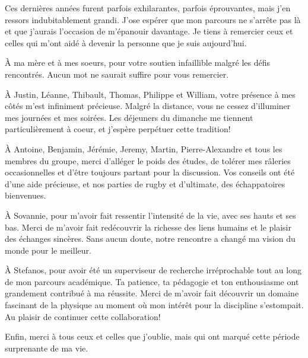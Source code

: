 \begin{comment}
\end{comment}

Ces dernières années furent parfois exhilarantes, parfois éprouvantes, mais j'en ressors indubitablement grandi. J'ose espérer que mon parcours ne s'arrête pas là et que j'aurais l'occasion de m'épanouir davantage. Je tiens à remercier ceux et celles qui m'ont aidé à devenir la personne que je suis aujourd'hui.

À ma mère et à mes soeurs, pour votre soutien infaillible malgré les défis rencontrés. Aucun mot ne saurait suffire pour vous remercier.

À Justin, Léanne, Thibault, Thomas, Philippe et William, votre présence à mes côtés m'est infiniment précieuse. Malgré la distance, vous ne cessez d'illuminer mes journées et mes soirées. Les déjeuners du dimanche me tiennent particulièrement à coeur, et j'espère perpétuer cette tradition!

À Antoine, Benjamin, Jérémie, Jeremy, Martin, Pierre-Alexandre et tous les membres du groupe, merci d'alléger le poids des études, de tolérer mes râleries occasionnelles et d'être toujours partant pour la discussion. Vos conseils ont été d'une aide précieuse, et nos parties de rugby et d'ultimate, des échappatoires bienvenues.

À Sovannie, pour m'avoir fait ressentir l'intensité de la vie, avec ses hauts et ses bas. Merci de m'avoir fait redécouvrir la richesse des liens humains et le plaisir des échanges sincères. Sans aucun doute, notre rencontre a changé ma vision du monde pour le meilleur.

À Stefanos, pour avoir été un superviseur de recherche irréprochable tout au long de mon parcours académique. Ta patience, ta pédagogie et ton enthousiasme ont grandement contribué à ma réussite. Merci de m'avoir fait découvrir un domaine fascinant de la physique au moment où mon intérêt pour la discipline s'estompait. Au plaisir de continuer cette collaboration!

Enfin, merci à tous ceux et celles que j'oublie, mais qui ont marqué cette période surprenante de ma vie.

